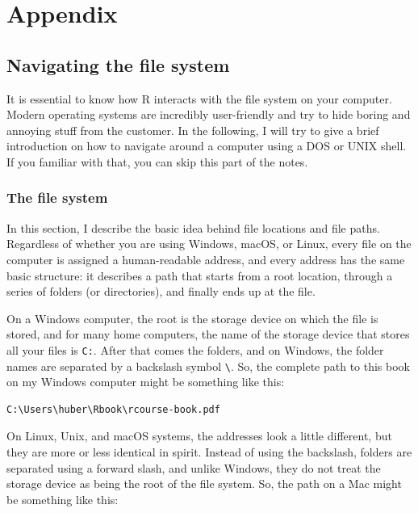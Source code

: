 \documentclass[
  12pt,
  oneside]{book}
\theoremstyle{definition}
\theoremstyle{definition}
\theoremstyle{definition}
\theoremstyle{definition}
\theoremstyle{remark}
\begin{document}
\hypertarget{appendix}{%
\chapter{Appendix}\label{appendix}}

\hypertarget{sec:navigation}{%
\section{Navigating the file system}\label{sec:navigation}}

It is essential to know how R interacts with the file system on your computer. Modern operating systems are incredibly user-friendly and try to hide boring and annoying stuff from the customer. In the following, I will try to give a brief introduction on how to navigate around a computer using a DOS or UNIX shell. If you familiar with that, you can skip this part of the notes.

\hypertarget{sec:filesystem}{%
\subsection{The file system}\label{sec:filesystem}}

In this section, I describe the basic idea behind file locations and file paths. Regardless of whether you are using Windows, macOS, or Linux, every file on the computer is assigned a human-readable address, and every address has the same basic structure: it describes a path that starts from a root location, through a series of folders (or directories), and finally ends up at the file.

On a Windows computer, the root is the storage device on which the file is stored, and for many home computers, the name of the storage device that stores all your files is \texttt{C:}. After that comes the folders, and on Windows, the folder names are separated by a backslash symbol \texttt{\textbackslash{}}. So, the complete path to this book on my Windows computer might be something like this:

\begin{verbatim}
C:\Users\huber\Rbook\rcourse-book.pdf
\end{verbatim}

On Linux, Unix, and macOS systems, the addresses look a little different, but they are more or less identical in spirit. Instead of using the backslash, folders are separated using a forward slash, and unlike Windows, they do not treat the storage device as being the root of the file system. So, the path on a Mac might be something like this:
\end{document}
